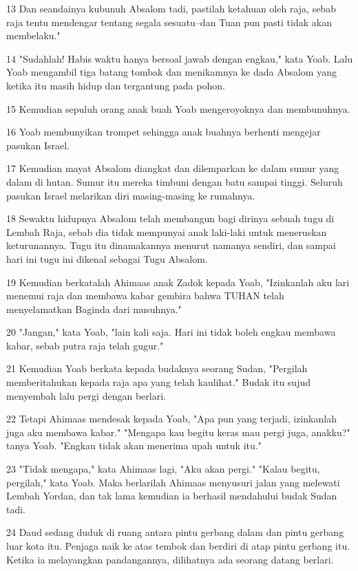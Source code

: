 \par 13 Dan seandainya kubunuh Absalom tadi, pastilah ketahuan oleh raja, sebab raja tentu mendengar tentang segala sesuatu--dan Tuan pun pasti tidak akan membelaku."
\par 14 "Sudahlah! Habis waktu hanya bersoal jawab dengan engkau," kata Yoab. Lalu Yoab mengambil tiga batang tombak dan menikamnya ke dada Absalom yang ketika itu masih hidup dan tergantung pada pohon.
\par 15 Kemudian sepuluh orang anak buah Yoab mengeroyoknya dan membunuhnya.
\par 16 Yoab membunyikan trompet sehingga anak buahnya berhenti mengejar pasukan Israel.
\par 17 Kemudian mayat Absalom diangkat dan dilemparkan ke dalam sumur yang dalam di hutan. Sumur itu mereka timbuni dengan batu sampai tinggi. Seluruh pasukan Israel melarikan diri masing-masing ke rumahnya.
\par 18 Sewaktu hidupnya Absalom telah membangun bagi dirinya sebuah tugu di Lembah Raja, sebab dia tidak mempunyai anak laki-laki untuk meneruskan keturunannya. Tugu itu dinamakannya menurut namanya sendiri, dan sampai hari ini tugu ini dikenal sebagai Tugu Absalom.
\par 19 Kemudian berkatalah Ahimaas anak Zadok kepada Yoab, "Izinkanlah aku lari menemui raja dan membawa kabar gembira bahwa TUHAN telah menyelamatkan Baginda dari musuhnya."
\par 20 "Jangan," kata Yoab, "lain kali saja. Hari ini tidak boleh engkau membawa kabar, sebab putra raja telah gugur."
\par 21 Kemudian Yoab berkata kepada budaknya seorang Sudan, "Pergilah memberitahukan kepada raja apa yang telah kaulihat." Budak itu sujud menyembah lalu pergi dengan berlari.
\par 22 Tetapi Ahimaas mendesak kepada Yoab, "Apa pun yang terjadi, izinkanlah juga aku membawa kabar." "Mengapa kau begitu keras mau pergi juga, anakku?" tanya Yoab. "Engkau tidak akan menerima upah untuk itu."
\par 23 "Tidak mengapa," kata Ahimaas lagi, "Aku akan pergi." "Kalau begitu, pergilah," kata Yoab. Maka berlarilah Ahimaas menyusuri jalan yang melewati Lembah Yordan, dan tak lama kemudian ia berhasil mendahului budak Sudan tadi.
\par 24 Daud sedang duduk di ruang antara pintu gerbang dalam dan pintu gerbang luar kota itu. Penjaga naik ke atas tembok dan berdiri di atap pintu gerbang itu. Ketika ia melayangkan pandangannya, dilihatnya ada seorang datang berlari.
